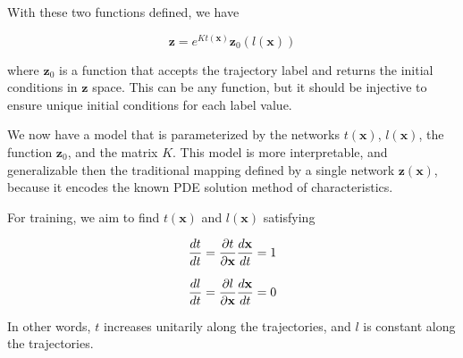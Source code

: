 \documentclass[12pt, letterpaper]{article}
\begin{document}
With these two functions defined, we have

\begin{equation}
    \mathbf{z} = e^{Kt(\mathbf{x})}\mathbf{z}_0(l(\mathbf{x}))
\end{equation}

where $\mathbf{z}_0$ is a function that accepts the trajectory label and returns the initial conditions in $\mathbf{z}$ space.  This can be any function, but it should be injective to ensure unique initial conditions for each label value.

We now have a model that is parameterized by the networks $t(\mathbf{x})$, $l(\mathbf{x})$, the function $\mathbf{z}_0$, and the matrix $K$.  This model is more interpretable, and generalizable then the traditional mapping defined by a single network $\mathbf{z}(\mathbf{x})$, because it encodes the known PDE solution method of characteristics.  

For training, we aim to find $t(\mathbf{x})$ and $l(\mathbf{x})$ satisfying

\begin{equation}
        \frac{dt}{dt} = \frac{\partial t}{\partial \mathbf{x}} \frac{d \mathbf{x}}{dt} = 1 \\ \\
\end{equation}

\begin{equation}
        \frac{dl}{dt} = \frac{\partial l}{\partial \mathbf{x}} \frac{d \mathbf{x}}{dt} = 0 \\ \\
\end{equation}

In other words, $t$ increases unitarily along the trajectories, and $l$ is constant along the trajectories.  

%
%
\end{document}
